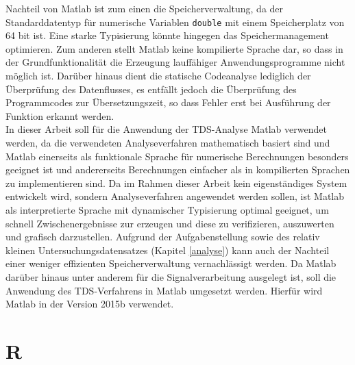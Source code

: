 Nachteil von Matlab ist zum einen die Speicherverwaltung, da der Standarddatentyp für numerische Variablen \texttt{double} mit einem Speicherplatz von 64 bit ist. Eine starke Typisierung könnte hingegen das Speichermanagement optimieren. Zum anderen stellt Matlab keine kompilierte Sprache dar, so dass in der Grundfunktionalität die Erzeugung lauffähiger Anwendungsprogramme nicht möglich ist. Darüber hinaus dient die statische Codeanalyse lediglich der Überprüfung des Datenflusses, es entfällt jedoch die Überprüfung des Programmcodes zur Übersetzungszeit, so dass Fehler erst bei Ausführung der Funktion erkannt werden.\\

In dieser Arbeit soll für die Anwendung der \acs{TDS}-Analyse Matlab verwendet werden, da die verwendeten Analyseverfahren mathematisch basiert sind und Matlab einerseits als funktionale Sprache für numerische Berechnungen besonders geeignet ist und andererseits Berechnungen einfacher als in kompilierten Sprachen zu implementieren sind. Da im Rahmen dieser Arbeit kein eigenständiges System entwickelt wird, sondern Analyseverfahren angewendet werden sollen, ist Matlab als interpretierte Sprache mit dynamischer Typisierung optimal geeignet, um schnell Zwischenergebnisse zur erzeugen und diese zu verifizieren, auszuwerten und grafisch darzustellen. Aufgrund der Aufgabenstellung sowie des relativ kleinen Untersuchungsdatensatzes (Kapitel \ref{analyse}) kann auch der Nachteil einer weniger effizienten Speicherverwaltung vernachlässigt werden. Da Matlab darüber hinaus unter anderem für die Signalverarbeitung ausgelegt ist, soll die Anwendung des \acs{TDS}-Verfahrens in Matlab umgesetzt werden. Hierfür wird  Matlab in der Version 2015b verwendet.

%


\section{R}

